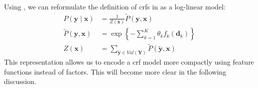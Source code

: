 \bigskip

Using , we can reformulate the definition of \glspl{crf} in  as a \gls{log-linear model}:
\begin{equation}
  \label{equ:crf-log-linear}
  \begin{split}
    P(\mathbf{y}\mid\mathbf{x}) & = \frac{1}{Z(\mathbf{x})}\tilde{P}(\mathbf{y},\mathbf{x}) \\
    \tilde{P}(\mathbf{y},\mathbf{x}) & = \exp\left\{ -\sum_{k=1}^K \theta_k f_k\left(\mathbf{d}_k\right)\right\} \\
    Z(\mathbf{x}) & = \sum_{\mathbf{\tilde{y}}\in Val(\mathbf{Y})}\tilde{P}(\mathbf{\tilde{y}},\mathbf{x})
  \end{split}
\end{equation}
This representation allows us to encode a \gls{crf} model more compactly using \glspl{feature function} instead of \glspl{factor}.
This will become more clear in the following discussion.

\bigskip


